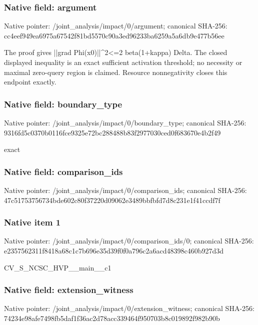 \documentclass[10pt,a4paper]{article}
\begin{document}
\subsubsection{Native field: argument}
Native pointer: /joint\_\allowbreak{}analysis/impact/0/argument; canonical SHA-256: cc4eef949ea6975a67542f81bd5570c90a3ed96233ba6259a5a6db9e477b56ee

\begingroup\raggedright\sloppy The proof gives ||grad Phi(x0)||\textasciicircum{}2<=\allowbreak{}2 beta(1+kappa) Delta. The closed displayed inequality is an exact sufficient activation threshold;\allowbreak{} no necessity or maximal zero-query region is claimed. Resource nonnegativity closes this endpoint exactly.\par\endgroup

\subsubsection{Native field: boundary\_\allowbreak{}type}
Native pointer: /joint\_\allowbreak{}analysis/impact/0/boundary\_\allowbreak{}type; canonical SHA-256: 9316fd5c0370b0116fce9325e72bc288488b83f2977030ced0f683670e4b2f49

\begingroup\raggedright\sloppy exact\par\endgroup

\subsubsection{Native field: comparison\_\allowbreak{}ids}
Native pointer: /joint\_\allowbreak{}analysis/impact/0/comparison\_\allowbreak{}ids; canonical SHA-256: 47c51753756734bde602c80f37220d09062e3489bbfbfd7d8c231e1f41ccdf7f

\subsubsection{Native item 1}
Native pointer: /joint\_\allowbreak{}analysis/impact/0/comparison\_\allowbreak{}ids/0; canonical SHA-256: e2357562311f8418a68c1c7b696e35d39f0f0a796c2a6acd48398c460b927d3d

\begingroup\raggedright\sloppy CV\_\allowbreak{}S\_\allowbreak{}NCSC\_\allowbreak{}HVP\_\allowbreak{}\_\allowbreak{}main\_\allowbreak{}\_\allowbreak{}c1\par\endgroup

\subsubsection{Native field: extension\_\allowbreak{}witness}
Native pointer: /joint\_\allowbreak{}analysis/impact/0/extension\_\allowbreak{}witness; canonical SHA-256: 74234e98afe7498fb5daf1f36ac2d78acc339464f950703b8c019892f982b90b
\end{document}
